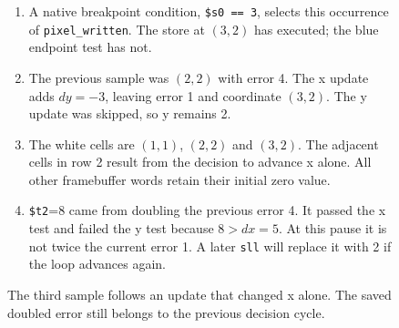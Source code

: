 \begin{figure}[htbp]
  \par\smallskip
  \begin{minipage}{\linewidth}
    \small
    \begin{enumerate}
      \item A native breakpoint condition, \texttt{\$s0 == 3}, selects this occurrence of \texttt{pixel\_written}. The store at $(3,2)$ has executed; the blue endpoint test has not.
      \item The previous sample was $(2,2)$ with error 4. The x update adds $dy=-3$, leaving error 1 and coordinate $(3,2)$. The y update was skipped, so y remains 2.
      \item The white cells are $(1,1)$, $(2,2)$ and $(3,2)$. The adjacent cells in row 2 result from the decision to advance x alone. All other framebuffer words retain their initial zero value.
      \item \texttt{\$t2}=8 came from doubling the previous error 4. It passed the x test and failed the y test because $8>dx=5$. At this pause it is not twice the current error 1. A later \texttt{sll} will replace it with 2 if the loop advances again.
    \end{enumerate}
  \end{minipage}
  \caption{The third sample follows an update that changed x alone. The saved doubled error still belongs to the previous decision cycle.}
  \label{capture:007-bresenham-line-f03-middle}
\end{figure}
\par
